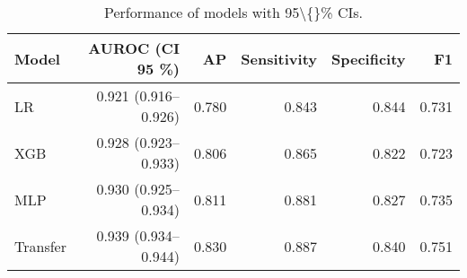 \documentclass[diagnostics,article,submit,pdftex,moreauthors]{Definitions/mdpi}
\begin{document}
%
\begin{table}[t]
\centering
\small
\begin{tabular}{lrrrrr}
\toprule
Model & AUROC (CI 95 \%) & AP & Sensitivity & Specificity & F1 \\
\midrule
LR & 0.921 (0.916--0.926) & 0.780 & 0.843 & 0.844 & 0.731 \\
XGB & 0.928 (0.923--0.933) & 0.806 & 0.865 & 0.822 & 0.723 \\
MLP & 0.930 (0.925--0.934) & 0.811 & 0.881 & 0.827 & 0.735 \\
Transfer & 0.939 (0.934--0.944) & 0.830 & 0.887 & 0.840 & 0.751 \\
\bottomrule
\end{tabular}

\caption{Performance of models with 95\textbackslash\{\}\% CIs.}
\label{tab:model-compare-gc1}
\end{table}
\end{document}
